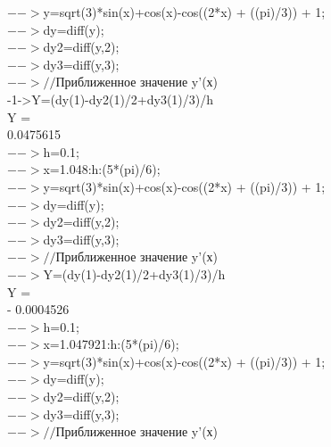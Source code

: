 \documentclass[russian,utf8,nocolumnxxxi,nocolumnxxxii]{eskdtext}
\begin{document}
  $-->$y=sqrt(3)*sin(x)+cos(x)-cos((2*x) + ((pi)/3)) + 1;\\

  $-->$dy=diff(y);\\

  $-->$dy2=diff(y,2);\\

  $-->$dy3=diff(y,3);\\

  $-->//$Приближенное значение y’(х)\\

-1->Y=(dy(1)-dy2(1)/2+dy3(1)/3)/h\\
 Y  =\\

    0.0475615\\

  $-->$h=0.1;\\

  $-->$x=1.048:h:(5*(pi)/6);\\

  $-->$y=sqrt(3)*sin(x)+cos(x)-cos((2*x) + ((pi)/3)) + 1;\\

  $-->$dy=diff(y);\\

  $-->$dy2=diff(y,2);\\

  $-->$dy3=diff(y,3);\\

  $-->//$Приближенное значение y’(х)\\

  $-->$Y=(dy(1)-dy2(1)/2+dy3(1)/3)/h\\
 Y  =\\

  - 0.0004526\\

  $-->$h=0.1;\\

  $-->$x=1.047921:h:(5*(pi)/6);\\

  $-->$y=sqrt(3)*sin(x)+cos(x)-cos((2*x) + ((pi)/3)) + 1;\\

  $-->$dy=diff(y);\\

  $-->$dy2=diff(y,2);\\

  $-->$dy3=diff(y,3);\\

  $-->//$Приближенное значение y’(х)\\
\end{document}
